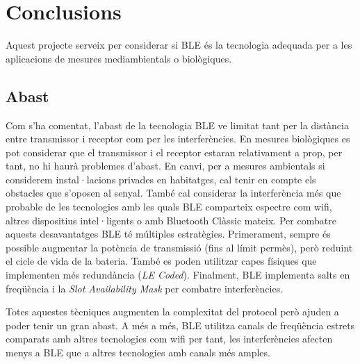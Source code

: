 \cleardoublepage
{}
\chapter*{Conclusions}

Aquest projecte serveix per considerar si BLE és la tecnologia adequada per a les aplicacions de mesures mediambientals o biològiques.



\section*{Abast}

Com s'ha comentat, l'abast de la tecnologia BLE ve limitat tant per la distància entre transmissor i receptor com per les interferències.
En mesures biològiques es pot considerar que el transmissor i el receptor estaran relativament a prop, per tant, no hi haurà problemes d'abast.
En canvi, per a mesures ambientals si considerem instal·lacions privades en habitatges, cal tenir en compte els obstacles que s'oposen al senyal.
També cal considerar la interferència més que probable de les tecnologies amb les quals BLE comparteix espectre com wifi, altres dispositius intel·ligents o amb Bluetooth Clàssic mateix.
Per combatre aquests desavantatges BLE té múltiples estratègies.
Primerament, sempre és possible augmentar la potència de transmissió (fins al límit permès), però reduint el cicle de vida de la bateria.
També es poden utilitzar capes físiques que implementen més redundància (\textit{LE Coded}).
Finalment, BLE implementa salts en freqüència i la \textit{Slot Availability Mask} per combatre interferències.

Totes aquestes tècniques augmenten la complexitat del protocol però ajuden a poder tenir un gran abast.
A més a més, BLE utilitza canals de freqüència estrets comparats amb altres tecnologies com wifi per tant, les interferències afecten menys a BLE que a altres tecnologies amb canals més amples.

